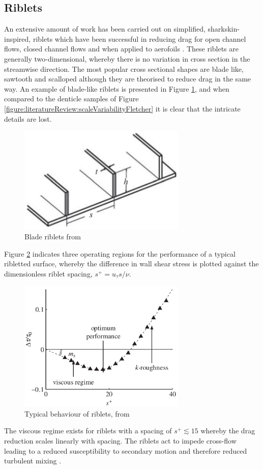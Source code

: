 \documentclass[12pt,oneside,a4paper]{article}
\begin{document}
\subsection{Riblets}
\label{section:literatureReview:Riblets}
 An extensive amount of work has been carried out on simplified, sharkskin-inspired, riblets which have been successful in reducing drag for open channel flows, closed channel flows and when applied to aerofoils \citep{bixler2013review}. These riblets are generally two-dimensional, whereby there is no variation in cross section in the streamwise direction. The most popular cross sectional shapes are blade like, sawtooth and scalloped although they are theorised to reduce drag in the same way. An example of blade-like riblets is presented in Figure \ref{figure:literatureReview:bladeRiblets}, and when compared to the denticle samples of Figure \ref{figure:literatureReview:scaleVariabilityFletcher} it is clear that the intricate details are lost.
%
\begin{figure}[!t]
\centering
\includegraphics[width=8cm]{images/bladeRiblets.png}
\caption{Blade riblets from \cite{dean2010}}
\label{figure:literatureReview:bladeRiblets}
\end{figure} 
%
Figure \ref{figure:literatureReview:ribletPerformanceRegions} indicates three operating regions for the performance of a typical ribletted surface, whereby the difference in wall shear stress is plotted against the dimensionless riblet spacing, $s^+ = u_\tau s / \nu$.
%
\begin{figure}[!b]
\centering
\includegraphics[width=8cm]{images/litReview/ribletPerformanceRegions.png}
\caption{Typical behaviour of riblets, from \cite{garcia2011}}
\label{figure:literatureReview:ribletPerformanceRegions}
\end{figure}
%
The viscous regime exists for riblets with a spacing of $s^+  \lesssim 15$ whereby the drag reduction scales linearly with spacing. The riblets act to impede cross-flow leading to a reduced susceptibility to secondary motion and therefore reduced turbulent mixing \citep{boomsma2015}. 
\end{document}
